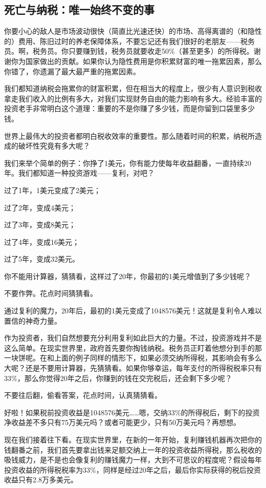 \subsection{死亡与纳税：唯一始终不变的事}

你要小心的敌人是市场波动很快（简直比光速还快）的市场、高得离谱的（和隐性的）费用、陈旧过时的养老保障体系，不要忘记还有我们很好的老朋友——税务员。啊，税务员。你只要赚到钱，税务员就要收走50\%（甚至更多）的所得税。谢谢你为国家做出的贡献。如果你认为隐性费用是你积累财富的唯一拖累因素，那么你错了，你遗漏了最大最严重的拖累因素。

我们都知道纳税会拖累你的财富积累，但在相当大的程度上，很少有人意识到税收拿走我们收入的比例有多大，对我们实现财务自由的能力影响有多大。经验丰富的投资老手非常明白这个道理：重要的不是你赚了多少钱，而是你留到口袋里多少钱。

世界上最伟大的投资者都明白税收效率的重要性。那么随着时间的积累，纳税所造成的破坏性究竟有多大呢？

我们来举个简单的例子：你挣了1美元，你有能力使每年收益翻番，一直持续20年。我们都知道一种投资游戏——复利，对吧？

过了1年，1美元变成了2美元；

过了2年，变成4美元；

过了3年，变成8美元；

过了4年，变成16美元；

过了5年，变成32美元。

你不能用计算器，猜猜看，这样过了20年，你最初的1美元增值到了多少钱呢？

不要作弊。花点时间猜猜看。

通过复利的魔力，20年后，最初的1美元变成了1048576美元！这就是复利令人难以置信的神奇力量。

作为投资者，我们自然想要充分利用复利如此巨大的力量。不过，投资游戏并不是这么简单。在现实世界里，政府首先要你掏钱纳税。税务员正盯着他想分到手的那一块饼呢。在和上面的例子同样的情形下，如果必须交纳所得税，其影响会有多么大呢？还是不要用计算器，先猜猜看。如果你够幸运，每年支付的所得税税率只有33\%，那么你觉得20年之后，你赚到的钱在交完税后，还会剩下多少呢？

不要往后翻，偷看答案，花点时间，认真猜猜看。

好啦！如果税前投资收益是1048576美元……嗯，交纳33\%的所得税后，剩下的投资净收益差不多只有75万美元吗？或者可能更少，只有50万美元吗？再想想。

现在我们接着往下看。在现实世界里，在新的一年开始，复利赚钱机器再次把你的钱翻番之前，我们首先要拿出钱来足额交纳上一年的投资收益所得税，那么税收的吸钱威力，是不是也会像复利的赚钱魔力一样，大到不可思议的程度呢？假设每年投资收益的所得税税率为33\%，同样是经过20年之后，最后你实际获得的税后投资收益只有2.8万多美元。

